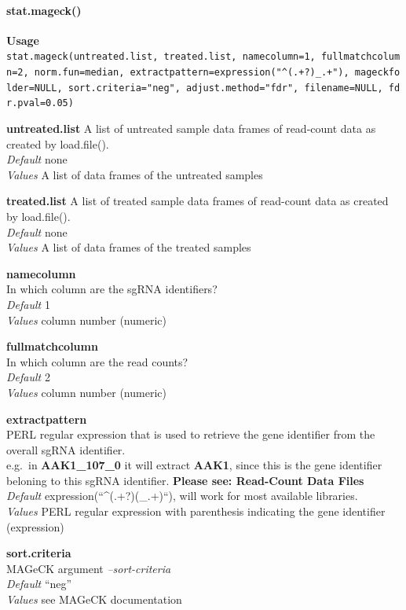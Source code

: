 \documentclass[]{article}
\let\oldparagraph\paragraph
\renewcommand{\paragraph}[1]{\oldparagraph{#1}\mbox{}}
\begin{document}
\paragraph{stat.mageck()}\label{stat.mageck}

\textbf{Usage}\\
\texttt{stat.mageck(untreated.list,\ treated.list,\ namecolumn=1,\ fullmatchcolumn=2,\ norm.fun=median,\ extractpattern=expression("\^{}(.+?)\_.+"),\ mageckfolder=NULL,\ sort.criteria="neg",\ adjust.method="fdr",\ filename=NULL,\ fdr.pval=0.05)}

\textbf{untreated.list} A list of untreated sample data frames of
read-count data as created by load.file().\\
\emph{Default} none\\
\emph{Values} A list of data frames of the untreated samples

\textbf{treated.list} A list of treated sample data frames of read-count
data as created by load.file().\\
\emph{Default} none\\
\emph{Values} A list of data frames of the treated samples

\textbf{namecolumn}\\
In which column are the sgRNA identifiers?\\
\emph{Default} 1\\
\emph{Values} column number (numeric)

\textbf{fullmatchcolumn}\\
In which column are the read counts?\\
\emph{Default} 2\\
\emph{Values} column number (numeric)

\textbf{extractpattern}\\
PERL regular expression that is used to retrieve the gene identifier
from the overall sgRNA identifier.\\
e.g.~in \textbf{AAK1\_107\_0} it will extract \textbf{AAK1}, since this
is the gene identifier beloning to this sgRNA identifier. \textbf{Please
see: Read-Count Data Files}\\
\emph{Default} expression(``\^{}(.+?)(\_.+)``), will work for most
available libraries.\\
\emph{Values} PERL regular expression with parenthesis indicating the
gene identifier (expression)

\textbf{sort.criteria}\\
MAGeCK argument \emph{--sort-criteria}\\
\emph{Default} ``neg''\\
\emph{Values} see MAGeCK documentation
\end{document}
